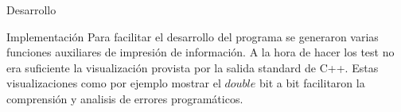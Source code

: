 \begin{section}{Desarrollo}
\begin{subsection}{Implementación}
		Para facilitar el desarrollo del programa se generaron varias funciones auxiliares de impresión de información. A la hora de hacer los test no era suficiente la visualización provista por la salida standard de C++. Estas visualizaciones como por ejemplo mostrar el $double$ bit a bit facilitaron la comprensión y analisis de errores programáticos.
		
	\end{subsection}
\end{section}
